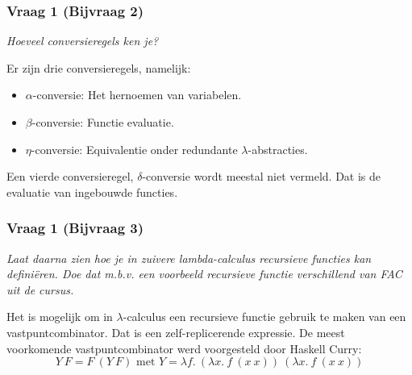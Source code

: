 \subsubsection{Vraag 1 (Bijvraag 2)}

\textit{Hoeveel conversieregels ken je?}

Er zijn drie conversieregels, namelijk:

\begin{itemize}
\item $\alpha$-conversie: Het hernoemen van variabelen.
\item $\beta$-conversie: Functie evaluatie.
\item $\eta$-conversie: Equivalentie onder redundante $\lambda$-abstracties.
\end{itemize}

Een vierde conversieregel, $\delta$-conversie wordt meestal niet vermeld. Dat is de evaluatie van ingebouwde functies.

\subsubsection{Vraag 1 (Bijvraag 3)}

\textit{Laat daarna zien hoe je in zuivere lambda-calculus recursieve functies kan defini\"eren. Doe dat m.b.v. een voorbeeld recursieve functie verschillend van FAC uit de cursus.}

Het is mogelijk om in $\lambda$-calculus een recursieve functie gebruik te maken van een vastpuntcombinator. Dat is een zelf-replicerende expressie. De meest voorkomende vastpuntcombinator werd voorgesteld door Haskell Curry:
\begin{equation*}
  Y\ F = F\ (Y\ F) \text{ met } Y = \lambda f.\ (\lambda x.\ f\ (x\ x))\ (\lambda x.\ f\ (x\ x))
\end{equation*}

